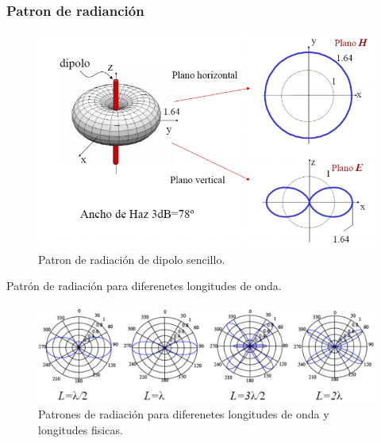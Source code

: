 \documentclass[12pt,letterpaper]{article}
\begin{document}
\subsubsection{Patron de radianción}
\begin{figure}[ht]
    \centering
    \includegraphics[width=.7\textwidth]{fig1.png}
    \caption{Patron de radiación de dipolo sencillo.}
\end{figure}
Patrón de radiación para diferenetes longitudes de onda.
\begin{figure}[ht]
    \centering
    \includegraphics[width=1\textwidth]{fig2.png}
    \caption{Patrones de radiación para diferenetes longitudes de onda y longitudes fisicas.}
\end{figure}

\newpage
\end{document}
